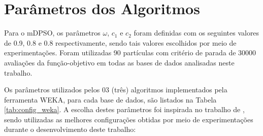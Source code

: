\documentclass[
	12pt,				%
	openany,			%
	oneside,	
	a4paper,			%
	brazil,				%
	]{unimontes-ppgmsc-abntex2}
\begin{document}
\section{Parâmetros dos Algoritmos}

Para o mDPSO, os parâmetros $\omega$, $c_1$ e $c_2$ foram definidas com os seguintes valores de 0.9, 0.8 e 0.8 respectivamente, sendo tais valores escolhidos por meio de experimentações. Foram utilizadas 90 partículas com critério de parada de 30000 avaliações da função-objetivo em todas as bases de dados analisadas neste trabalho.

Os parâmetros utilizados pelos 03 (três) algoritmos implementados pela ferramenta WEKA, para cada base de dados, são listados na Tabela \ref{tab:config_weka}. A escolha destes parâmetros foi inspirada no trabalho de , sendo utilizadas as melhores configurações obtidas por meio de experimentações durante o desenvolvimento deste trabalho:

\begin{table}[ht]
\setlength{\arrayrulewidth}{.2em}
\vspace{12pt}
\centering{}
\caption{Parâmetros de configuração do WEKA em cada base de dados.}
\label{tab:config_weka}
\end{table}
\end{document}
